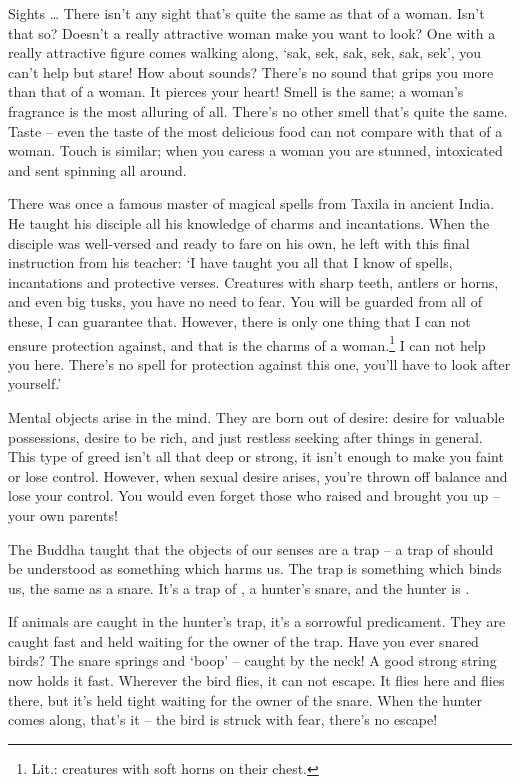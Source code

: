 Sights \ldots{} There isn't any sight that's quite the same as that of a woman. Isn't that so? Doesn't a really attractive woman make you want to look? One with a really attractive figure comes walking along, `sak, sek, sak, sek, sak, sek', you can't help but stare! How about sounds? There's no sound that grips you more than that of a woman. It pierces your heart! Smell is the same; a woman's fragrance is the most alluring of all. There's no other smell that's quite the same. Taste -- even the taste of the most delicious food can not compare with that of a woman. Touch is similar; when you caress a woman you are stunned, intoxicated and sent spinning all around. 

There was once a famous master of magical spells from Taxila in ancient India. He taught his disciple all his knowledge of charms and incantations. When the disciple was well-versed and ready to fare on his own, he left with this final instruction from his teacher: `I have taught you all that I know of spells, incantations and protective verses. Creatures with sharp teeth, antlers or horns, and even big tusks, you have no need to fear. You will be guarded from all of these, I can guarantee that. However, there is only one thing that I can not ensure protection against, and that is the charms of a woman.\footnote{Lit.: creatures with soft horns on their chest.} I can not help you here. There's no spell for protection against this one, you'll have to look after yourself.' 

Mental objects arise in the mind. They are born out of desire: desire for valuable possessions, desire to be rich, and just restless seeking after things in general. This type of greed isn't all that deep or strong, it isn't enough to make you faint or lose control. However, when sexual desire arises, you're thrown off balance and lose your control. You would even forget those who raised and brought you up -- your own parents! 

The Buddha taught that the objects of our senses are a trap -- a trap of   should be understood as something which harms us. The trap is something which binds us, the same as a snare. It's a trap of , a hunter's snare, and the hunter is . 

If animals are caught in the hunter's trap, it's a sorrowful predicament. They are caught fast and held waiting for the owner of the trap. Have you ever snared birds? The snare springs and `boop' -- caught by the neck! A good strong string now holds it fast. Wherever the bird flies, it can not escape. It flies here and flies there, but it's held tight waiting for the owner of the snare. When the hunter comes along, that's it -- the bird is struck with fear, there's no escape! 

